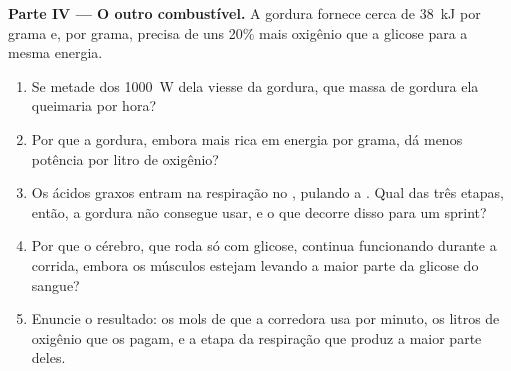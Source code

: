\begin{problem}
\medskip
\noindent\textbf{Parte IV --- O outro combustível.}
A gordura fornece cerca de \qty{38}{kJ} por grama e, por grama, precisa
de uns 20\% mais oxigênio que a glicose para a mesma energia.
\begin{enumerate}[resume]
  \item Se metade dos \qty{1000}{W} dela viesse da gordura, que massa
        de gordura ela queimaria por hora?
  \item Por que a gordura, embora mais rica em energia por grama, dá
        menos potência por litro de oxigênio?
  \item Os ácidos graxos entram na respiração no ,
        pulando a . Qual das três etapas, então, a gordura não
        consegue usar, e o que decorre disso para um sprint?
  \item Por que o cérebro, que roda só com glicose, continua
        funcionando durante a corrida, embora os músculos estejam
        levando a maior parte da glicose do sangue?
  \item Enuncie o resultado: os mols de  que a corredora usa por
        minuto, os litros de oxigênio que os pagam, e a etapa da
        respiração que produz a maior parte deles.
\end{enumerate}
\end{problem}

